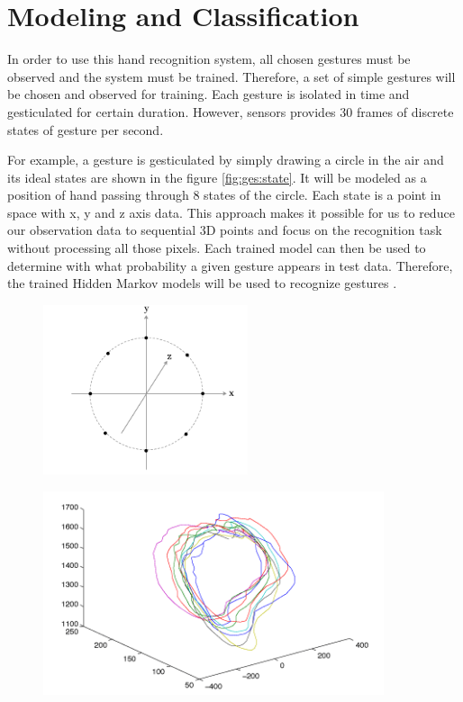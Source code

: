 \section{Modeling and Classification}
In order to use this hand recognition system, all chosen gestures must be observed and the system must be trained. Therefore, a set of simple gestures will be chosen and observed for training. Each gesture is isolated in time and gesticulated for certain duration. However, sensors provides 30 frames of discrete states of gesture per second. 

For example, a gesture is gesticulated by simply drawing a circle in the air and its ideal states are shown in the figure \ref{fig:ges:state}. It will be modeled as a position of hand passing through 8 states of the circle. Each state is a point in space with x, y and z axis data. This approach makes it possible for us to reduce our observation data to sequential 3D points and focus on the recognition task without processing all those pixels. Each trained model can then be used to determine with what probability a given gesture appears in test data. Therefore, the trained Hidden Markov models will be used to recognize gestures \cite{2}. 

\begin{figure}
	\centering
	\begin{minipage}{.3\textwidth}
		\centering
		\includegraphics[width=6cm]{figures/ges-states.png}
		\label{fig:ges:state}
	\end{minipage}%
	\begin{minipage}{.7\textwidth}
		\centering
		\includegraphics[width=10cm]{figures/ges-train.png}
		\label{fig:ges:train}
	\end{minipage}
\end{figure}

